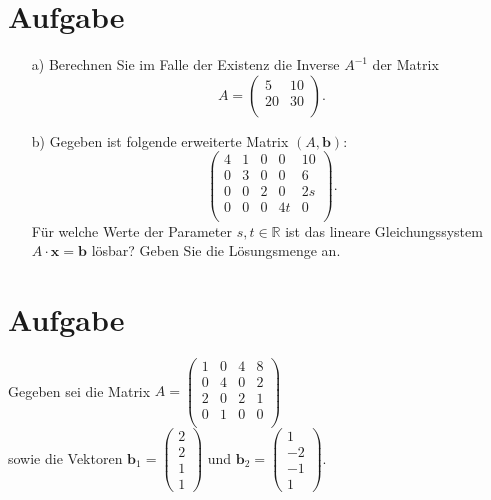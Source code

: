 \documentclass[fontsize=11pt, parskip=half]{scrartcl}
\newcommand{\R}{\mathbb{R}}
\newcommand{\four}[4]{\left(\begin{array}{c}#1\\#2\\#3\\#4\end{array}\right)}
\renewcommand{\vec}[1]{\boldsymbol #1}
\begin{document}
%

\section{Aufgabe}
\begin{enumerate}
\item [a)] Berechnen Sie im Falle der Existenz die Inverse $A^{-1}$ der Matrix
$$A=
\left(\begin{array}{cc}5& 10 \\20 & 30\\ \end{array}\right).
$$
\item [b)] Gegeben ist folgende erweiterte Matrix $(A,\vec{b})$:
$$
\left(\begin{array}{cccc|c}4& 1& 0& 0& 10\\0& 3& 0& 0& 6\\0& 0& 2& 0& 2s\\0& 0& 0& 4t& 0\\
\end{array}\right).
$$
Für welche Werte der Parameter $s,t \in \R$ ist das lineare
Gleichungssystem $A\cdot \vec{x}=\vec{b}$ lösbar? Geben Sie die
Lösungsmenge an.
\end{enumerate}







\section{Aufgabe}Gegeben sei die Matrix $
 A= \left( \begin{array}{cccc}  1 & 0 & 4 & 8 \\
                                0 & 4 & 0 & 2 \\
                                2 & 0 & 2 & 1 \\
                                0 & 1 & 0 & 0 \\ \end{array}\right)
$\\[0.3cm]
sowie die Vektoren $\vec{b_1}=\four{2}{2}{1}{1}$ und $\vec{b_2}=\four{1}{-2}{-1}{1}$.\\
\end{document}
